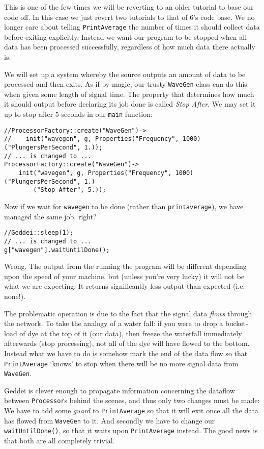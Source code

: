 This is one of the few times we will be reverting to an older tutorial to base our code off. In this case we just revert two tutorials to that of 6's code base. We no longer care about telling \texttt{PrintAverage} the number of times it should collect data before exiting explicitly. Instead we want our program to be stopped when all data has been processed successfully, regardless of how much data there actually is.

We will set up a system whereby the source outputs an amount of data to be processed and then exits. As if by magic, our trusty \texttt{WaveGen} class can do this when given some length of signal time. The property that determines how much it should output before declaring its job done is called \textit{Stop After}. We may set it up to stop after 5 seconds in our \texttt{main} function:

\begin{verbatim}
//ProcessorFactory::create("WaveGen")->
//    init("wavegen", g, Properties("Frequency", 1000)("PlungersPerSecond", 1.));
// ... is changed to ...
ProcessorFactory::create("WaveGen")->
    init("wavegen", g, Properties("Frequency", 1000)("PlungersPerSecond", 1.)
        ("Stop After", 5.));
\end{verbatim}

Now if we wait for \texttt{wavegen} to be done (rather than \texttt{printaverage}), we have managed the same job, right?

\begin{verbatim}
//Geddei::sleep(1);
// ... is changed to ...
g["wavegen"].waitUntilDone();
\end{verbatim}

Wrong. The output from the running the program will be different depending upon the speed of your machine, but (unless you're very lucky) it will not be what we are expecting: It returns significantly less output than expected (i.e. none!).

The problematic operation is due to the fact that the signal data \textit{flows} through the network. To take the analogy of a water fall: if you were to drop a bucket-load of dye at the top of it (our data), then freeze the waterfall immediately afterwards (stop processing), not all of the dye will have flowed to the bottom. Instead what we have to do is somehow mark the end of the data flow so that \texttt{PrintAverage} `knows' to stop when there will be no more signal data from \texttt{WaveGen}.

Geddei is clever enough to propagate information concerning the dataflow between \texttt{Processor}s behind the scenes, and thus only two changes must be made: We have to add some \textit{guard} to \texttt{PrintAverage} so that it will exit once all the data has flowed from \texttt{WaveGen} to it. And secondly we have to change our \texttt{waitUntilDone()}, so that it waits upon \texttt{PrintAverage} instead. The good news is that both are all completely trivial.

